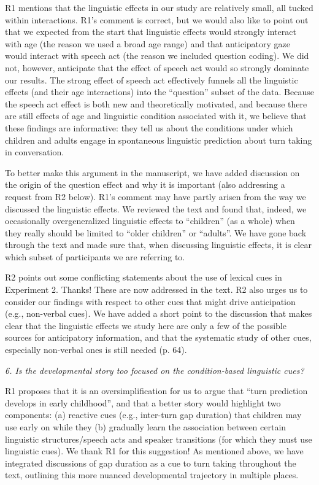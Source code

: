 \documentclass[11pt,a4paper]{letter} %
\begin{document}
\begin{letter}{}
\noindent R1 mentions that the linguistic effects in our study are relatively small, all tucked within interactions. R1's comment is correct, but we would also like to point out that we expected from the start that linguistic effects would strongly interact with age (the reason we used a broad age range) and that anticipatory gaze would interact with speech act (the reason we included question coding). We did not, however, anticipate that the effect of speech act would so strongly dominate our results. The strong effect of speech act effectively funnels all the linguistic effects (and their age interactions) into the ``question'' subset of the data. Because the speech act effect is both new and theoretically motivated, and because there are still effects of age and linguistic condition associated with it, we believe that these findings are informative: they tell us about the conditions under which children and adults engage in spontaneous linguistic prediction about turn taking in conversation.

\noindent To better make this argument in the manuscript, we have added discussion on the origin of the question effect and why it is important (also addressing a request from R2 below). R1's comment may have partly arisen from the way we discussed the linguistic effects. We reviewed the text and found that, indeed, we occasionally overgeneralized linguistic effects to ``children'' (as a whole) when they really should be limited to ``older children'' or ``adults''. We have gone back through the text and made sure that, when discussing linguistic effects, it is clear which subset of participants we are referring to.

\noindent R2 points out some conflicting statements about the use of lexical cues in Experiment 2. Thanks! These are now addressed in the text. R2 also urges us to consider our findings with respect to other cues that might drive anticipation (e.g., non-verbal cues). We have added a short point to the discussion that makes clear that the linguistic effects we study here are only a few of the possible sources for anticipatory information, and that the systematic study of other cues, especially non-verbal ones is still needed (p. 64).

\noindent \textit{6. Is the developmental story too focused on the condition-based linguistic cues?}

\noindent R1 proposes that it is an oversimplification for us to argue that ``turn prediction develops in early childhood'', and that a better story would highlight two components: (a) reactive cues (e.g., inter-turn gap duration) that children may use early on while they (b) gradually learn the association between certain linguistic structures/speech acts and speaker transitions (for which they must use linguistic cues). We thank R1 for this suggestion! As mentioned above, we have integrated discussions of gap duration as a cue to turn taking throughout the text, outlining this more nuanced developmental trajectory in multiple places.


\end{letter}
\end{document}
